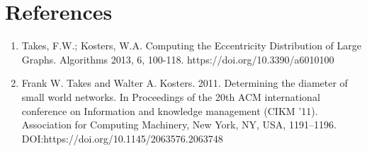 \documentclass[11pt]{article}
\begin{document}
\section{References}
\begin{enumerate}
\item Takes, F.W.; Kosters, W.A. Computing the Eccentricity Distribution of Large Graphs. Algorithms 2013, 6, 100-118. https://doi.org/10.3390/a6010100
\item Frank W. Takes and Walter A. Kosters. 2011. Determining the diameter of small world networks. In Proceedings of the 20th ACM international conference on Information and knowledge management (CIKM '11). Association for Computing Machinery, New York, NY, USA, 1191–1196. DOI:https://doi.org/10.1145/2063576.2063748
\end{enumerate}
\end{document}
